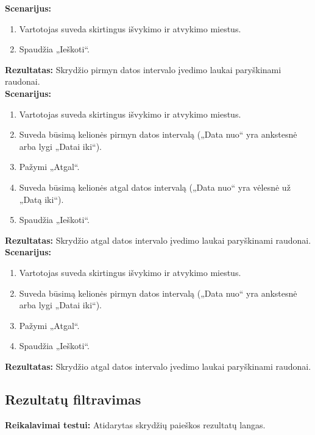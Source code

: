\documentclass{VUMIFPSkursinis}
\begin{document}
            \noindent\textbf{Scenarijus:}
                \begin{enumerate}
                    \item Vartotojas suveda skirtingus išvykimo ir atvykimo miestus.
                    \item Spaudžia „Ieškoti“.
                \end{enumerate}
            \textbf{Rezultatas:} Skrydžio pirmyn datos intervalo įvedimo laukai paryškinami raudonai.\\
            
            \noindent\textbf{Scenarijus:}
                \begin{enumerate}
                    \item Vartotojas suveda skirtingus išvykimo ir atvykimo miestus.
                    \item Suveda būsimą kelionės pirmyn datos intervalą („Data nuo“ yra ankstesnė arba lygi „Datai iki“).
                    \item Pažymi „Atgal“.
                    \item Suveda būsimą kelionės atgal datos intervalą („Data nuo“ yra vėlesnė už „Datą iki“).
                    \item Spaudžia „Ieškoti“.
                \end{enumerate}
            \textbf{Rezultatas:} Skrydžio atgal datos intervalo įvedimo laukai paryškinami raudonai.\\
            
            \noindent\textbf{Scenarijus:}
                \begin{enumerate}
                    \item Vartotojas suveda skirtingus išvykimo ir atvykimo miestus.
                    \item Suveda būsimą kelionės pirmyn datos intervalą („Data nuo“ yra ankstesnė arba lygi „Datai iki“).
                    \item Pažymi „Atgal“.
                    \item Spaudžia „Ieškoti“.
                \end{enumerate}
            \textbf{Rezultatas:} Skrydžio atgal datos intervalo įvedimo laukai paryškinami raudonai.\\
            
        \subsection{Rezultatų filtravimas}
            \noindent\textbf{Reikalavimai testui:} Atidarytas skrydžių paieškos rezultatų langas. \\
\end{document}
